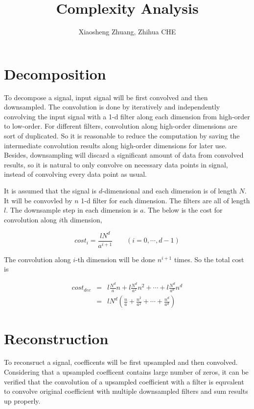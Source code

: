 \documentclass[a4paper,5pt]{article}
\title{Complexity Analysis}
\author{Xiaosheng Zhuang,    Zhihua CHE}
\date{}
\begin{document}
\maketitle

\tableofcontents

\section{Decomposition}

To decompose a signal, input signal will be first convolved and then downsampled. The convolution is done by iteratively and independently convolving the input signal with a 1-d filter along each dimension from high-order to low-order. For different filters, convolution along high-order dimensions are sort of duplicated. So it is reasonable to reduce the computation by saving the intermediate convolution results along high-order dimensions for later use. Besides, downsampling will discard a significant amount of data from convolved results, so it is natural to only convolve on necessary data points in signal, instead of convolving every data point as usual.

It is assumed that the signal is $d$-dimensional and each dimension is of length $N$. It will be convovled by $n$ 1-d filter for each dimension. The filters are all of length $l$. The downsample step in each dimension is $a$. The below is the cost for convolution along $i$th dimension,

\begin{equation}
cost_{i} = \frac{lN^{d}}{a^{i+1}} \quad\quad (i=0,\cdots,d-1)
\end{equation}

The convolution along $i$-th dimension will be done $n^{i+1}$ times. So the total cost is


\begin{eqnarray}
cost_{dec} &=& l\frac{N^{d}}{a}n+l\frac{N^{d}}{a^{2}}n^{2}+\cdots+l\frac{N^{d}}{a^{d}}n^{d}  \\
&=& lN^{d}\left(\frac{n}{a}+\frac{n^{2}}{a^{2}}+ \cdots+ \frac{n^{d}}{a^{d}} \right)  
\end{eqnarray}

\section{Reconstruction}

To reconsruct a signal, coefficents will be first upsampled and then convolved. Considering that a upsampled coefficent contains large number of zeros, it can be verified that the convolution of a  upsampled coefficient with a filter is equvalent to convolve original coefficient with multiple downsampled filters and sum results up properly. 
\end{document}
